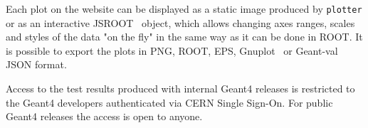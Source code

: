 

Each plot on the website can be displayed as a static image produced by {\tt plotter} or as an interactive JSROOT~\cite{JSROOT} object, which allows changing axes ranges, scales and styles of the data "on the fly" in the same way as it can be done in ROOT. It is possible to export the plots in PNG, ROOT, EPS, Gnuplot~\cite{gnuplot} or \textsf{Geant-val} JSON format. 

Access to the test results produced with internal Geant4 releases is restricted to the Geant4 developers authenticated via CERN Single Sign-On. For public Geant4 releases the access is open to anyone.





